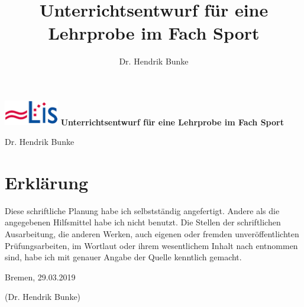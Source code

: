 \documentclass[12pt, a4paper]{scrartcl}
\begin{document}
\title{Unterrichtsentwurf für eine Lehrprobe im Fach Sport}
\author{Dr. Hendrik Bunke}
\date{}
\thispagestyle{empty}

\begin{center}
{\includegraphics[height=1.1cm]{lis.png}}
\singlespacing
{\Huge{\textsf{\textbf{Unterrichtsentwurf für eine Lehrprobe im Fach Sport}}}}

\vspace{0.5cm}
\Large{Dr. Hendrik Bunke}



\end{center}





\footnotesize
\renewcommand{\contentsname}{Gliederung}
\tableofcontents

\newpage
\setcounter{page}{1}
\normalsize












\clearpage
\pagestyle{empty}
\singlespacing



\newpage
\section*{Erklärung}
Diese schriftliche Planung habe ich selbstständig angefertigt. Andere als die
angegebenen Hilfsmittel habe ich nicht benutzt. Die Stellen der schriftlichen
Ausarbeitung, die anderen Werken, auch eigenen oder fremden unveröffentlichten
Prüfungsarbeiten, im Wortlaut oder ihrem wesentlichem Inhalt nach entnommen
sind, habe ich mit genauer Angabe der Quelle kenntlich gemacht.

\vspace{1cm}Bremen, 29.03.2019

\vspace{3cm}(Dr. Hendrik Bunke)




\end{document}

